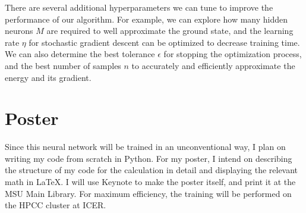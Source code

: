 \documentclass[prb,aps,twocolumn,showpacs,10pt]{revtex4-1}
\begin{document}
There are several additional hyperparameters we can tune to improve the performance of our algorithm. For example, we can explore how many hidden neurons $M$ are required to well approximate the ground state, and the learning rate $\eta$ for stochastic gradient descent can be optimized to decrease training time. We can also determine the best tolerance $\epsilon$ for stopping the optimization process, and the best number of samples $n$ to accurately and efficiently approximate the energy and its gradient.

 \section{Poster}
 
Since this neural network will be trained in an unconventional way, I plan on writing my code from scratch in Python. For my poster, I intend on describing the structure of my code for the calculation in detail and displaying the relevant math in LaTeX. I will use Keynote to make the poster itself, and print it at the MSU Main Library. For maximum efficiency, the training will be performed on the HPCC cluster at ICER.
\end{document}
